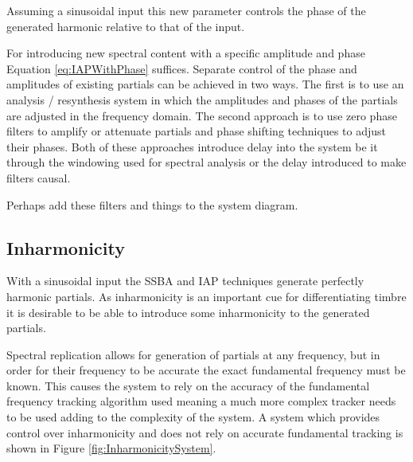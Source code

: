		Assuming a sinusoidal input this new parameter controls the phase of the generated harmonic relative to
		that of the input. 
		
		For introducing new spectral content with a specific amplitude and phase Equation \ref{eq:IAPWithPhase}
		suffices. Separate control of the phase and amplitudes of existing partials can be achieved in two ways.
		The first is to use an analysis / resynthesis system in which the amplitudes and phases of the partials are
		adjusted in the frequency domain. The second approach is to use zero phase filters to amplify or attenuate
		partials and phase shifting techniques to adjust their phases. Both of these approaches introduce delay
		into the system be it through the windowing used for spectral analysis or the delay introduced to make
		filters causal.

		\note
		{
			Perhaps add these filters and things to the system diagram.
		}

	\subsection{Inharmonicity}
	\label{sec:FeatureControl-Systems-Inharmonicity}
		With a sinusoidal input the SSBA and IAP techniques generate perfectly harmonic partials. As inharmonicity
		is an important cue for differentiating timbre it is desirable to be able to introduce some inharmonicity
		to the generated partials.

		Spectral replication allows for generation of partials at any frequency, but in order for their frequency
		to be accurate the exact fundamental frequency must be known. This causes the system to rely on the
		accuracy of the fundamental frequency tracking algorithm used meaning a much more complex tracker needs to
		be used adding to the complexity of the system. A system which provides control over inharmonicity and does
		not rely on accurate fundamental tracking is shown in Figure \ref{fig:InharmonicitySystem}.

